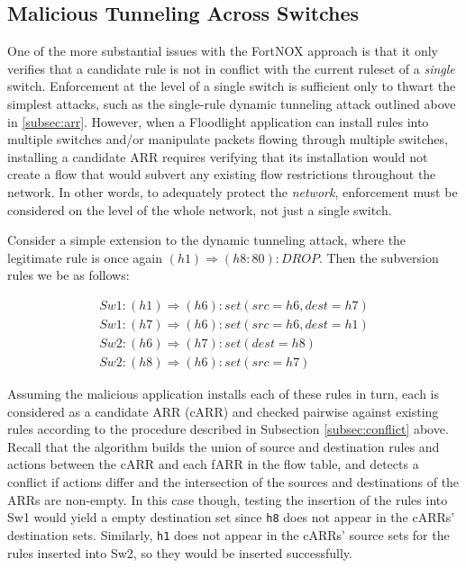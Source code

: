 
\subsection{Malicious Tunneling Across Switches}
One of the more substantial issues with the FortNOX approach is that it only verifies that a candidate rule is not in conflict with the current ruleset of a \emph{single} switch. Enforcement at the level of a single switch is sufficient only to thwart the simplest attacks, such as the single-rule dynamic tunneling attack outlined above in \ref{subsec:arr}. However, when a Floodlight application can install rules into multiple switches and/or manipulate packets flowing through multiple switches, installing a candidate ARR requires verifying that its installation would not create a flow that would subvert any existing flow restrictions throughout the network. In other words, to adequately protect the \emph{network}, enforcement must be considered on the level of the whole network, not just a single switch.

Consider a simple extension to the dynamic tunneling attack, where the legitimate rule is once again $(h1) \Rightarrow (h8:80): DROP$. Then the subversion rules we be as follows: 

\begin{align}
  Sw1: (h1) \Rightarrow (h6): set(src=h6, dest=h7) \\
  Sw1: (h7) \Rightarrow (h6): set(src=h6, dest=h1) \\
  Sw2: (h6) \Rightarrow (h7): set(dest=h8) \\
  Sw2: (h8) \Rightarrow (h6): set(src=h7)
\end{align}

Assuming the malicious application installs each of these rules in turn, each is considered as a candidate ARR (cARR) and checked pairwise against existing rules according to the procedure described in Subsection \ref{subsec:conflict} above. Recall that the algorithm builds the union of source and destination rules and actions between the cARR and each fARR in the flow table, and detects a conflict if actions differ and the intersection of the sources and destinations of the ARRs are non-empty. In this case though, testing the insertion of the rules into Sw1 would yield a empty destination set since \texttt{h8} does not appear in the cARRs' destination sets. Similarly, \texttt{h1} does not appear in the cARRs' source sets for the rules inserted into Sw2, so they would be inserted successfully. 

